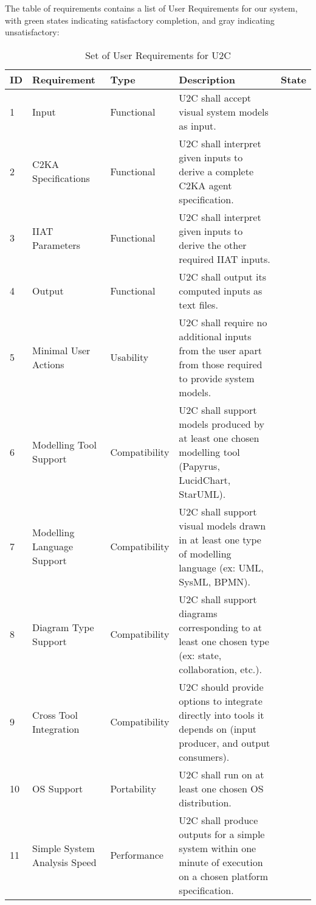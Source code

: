 The table of requirements contains a list of User Requirements for our system,
with green states indicating satisfactory completion, and gray indicating unsatisfactory:
\begin{longtable}{|l|p{2.6cm}|l|p{4.5cm}|c|}
    \caption{Set of User Requirements for U2C}
    \label{tab:user-reqs}
    \hline
    \textbf{ID} & \textbf{Requirement} & \textbf{Type}  & \textbf{Description} & \textbf{State} \\
    \hline
    \endhead
    \hline
    1 & Input & Functional & U2C shall accept visual system models as input. & \cellcolor{green!30}  \\
    \hline
    2 & C2KA Specifications & Functional & U2C shall interpret given inputs to derive a complete C2KA agent specification. & \cellcolor{green!30}  \\
    \hline
    3 & IIAT Parameters & Functional & U2C shall interpret given inputs to derive the other required IIAT inputs. & \cellcolor{gray!30}  \\
    \hline
    4 & Output & Functional & U2C shall output its computed inputs as text files. & \cellcolor{green!30}  \\
    \hline
    5 & Minimal User Actions & Usability & U2C shall require no additional inputs from the user apart from those required to provide system models. & \cellcolor{green!30}  \\
    \hline
    6 & Modelling Tool Support & Compatibility & U2C shall support models produced by at least one chosen modelling tool (Papyrus, LucidChart, StarUML). & \cellcolor{green!30}  \\
    \hline
    7 & Modelling Language Support & Compatibility & U2C shall support visual models drawn in at least one type of modelling language (ex: UML, SysML, BPMN). & \cellcolor{green!30}  \\
    \hline
    8 & Diagram Type Support & Compatibility & U2C shall support diagrams corresponding to at least one chosen type (ex: state, collaboration, etc.). & \cellcolor{green!30}  \\
    \hline
    9 & Cross Tool Integration & Compatibility & U2C should provide options to integrate directly into tools it depends on (input producer, and output consumers). & \cellcolor{gray!30}  \\
    \hline
    10 & OS Support & Portability & U2C shall run on at least one chosen OS distribution. & \cellcolor{green!30}  \\
    \hline
    11 & Simple System Analysis Speed & Performance & U2C shall produce outputs for a simple system within one minute of execution on a chosen platform specification.

\end{longtable}
